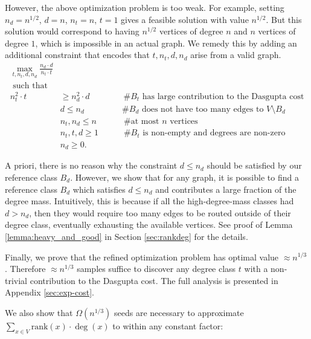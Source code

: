 \documentclass[letterpaper,11pt]{article}
\newcommand{\rank}{\mathrm{rank}}
\theoremstyle{plain}
\theoremstyle{definition}
\theoremstyle{remark}
\begin{document}
However, the above optimization problem is too weak. For example, setting $n_d = n^{1/2}$, $d = n$, $n_t = n$, $t=1$ gives a feasible solution with value $n^{1/2}$. But this solution would correspond to having $n^{1/2}$ vertices of degree $n$ and $n$ vertices of degree $1$, which is impossible in an actual graph. 
We remedy this by adding an additional constraint that encodes that  $t, n_t, d, n_d $ arise from a valid graph. 
\begin{align*}
      \max_{t,n_t,d,n_d} \frac{n_d \cdot d}{n_t \cdot t}  & \quad  \\
      \text{ such that}&\\
       n_t^2 \cdot t & \geq  n_d^2\cdot  d  \qquad \qquad \#\text{$B_t$  has large contribution to the Dasgupta cost} \\
            & d \leq n_d  \qquad \qquad \ \   \#\text{$B_d$ does not have too many edges to $V \setminus B_d$}\\
       &   n_t, n_d \leq n \qquad \quad  \ \#\text{at most $n$ vertices} \\
    &   n_t,t,d \geq 1 \qquad \quad  \#\text{$B_t$ is non-empty and degrees are non-zero} \\
      &   n_d\geq 0 . 
\end{align*}

A priori, there is no reason why the constraint $d \leq n_d$ should be satisfied by our reference class $B_d$. However, we show that for any graph, it is possible to find a reference class $B_d$ which satisfies $d \leq n_d$ and contributes a large fraction of the degree mass. Intuitively, this is because if all the high-degree-mass classes had $d> n_d$, then they would require too many edges to be routed outside of their degree class, eventually exhausting the available vertices. See proof of Lemma \ref{lemma:heavy_and_good} in Section \ref{sec:rankdeg} for the details.

Finally, we prove that the refined optimization problem has optimal value $\approx n^{1/3}$. Therefore $\approx n^{1/3}$ samples suffice to discover any degree class $t$ with a non-trivial contribution to the Dasgupta cost. The full analysis is presented in Appendix \ref{sec:exp-cost}. 

We also show that $\Omega(n^{1/3})$ seeds are necessary to approximate $\sum_{x\in V} \rank(x)\cdot \deg(x)$ to within any constant factor:
\end{document}
